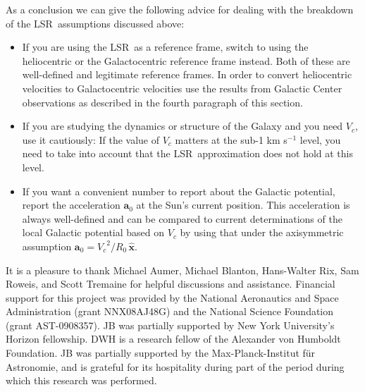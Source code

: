 \documentclass[12pt,preprint]{aastex}
\renewcommand{\vec}[1]{\mathbf{#1}} %
\newcommand{\eex}{\vec{\hat{x}}}
\newcommand{\lsrabb}{LSR}
\newcommand{\vcirc}{\ensuremath{V_c}}
\newcommand{\aao}{\vec{a}_0}
\begin{document}
As a conclusion we can give the following advice for dealing with the
breakdown of the \lsrabb\ assumptions discussed above:
\begin{itemize}
\item If you are using the \lsrabb\ as a reference frame, switch to
using the heliocentric or the Galactocentric reference frame
instead. Both of these are well-defined and legitimate reference
frames. In order to convert heliocentric velocities to Galactocentric
velocities use the results from Galactic Center observations as
described in the fourth paragraph of this section.
\item If you are studying the dynamics or structure of the Galaxy and
you need $\vcirc$, use it cautiously: If the value of $\vcirc$ matters
at the sub-1 km s$^{-1}$ level, you need to take into account that the
\lsrabb\ approximation does not hold at this level.
\item If you want a convenient number to report about the Galactic
potential, report the acceleration $\aao$ at the Sun's current
position. This acceleration is always well-defined and can be compared
to current determinations of the local Galactic potential based on
$\vcirc$ by using that under the axisymmetric assumption $\aao =
\vcirc^2/R_0 \,\eex$.
\end{itemize}


\acknowledgments It is a pleasure to thank Michael Aumer, Michael
Blanton, Hans-Walter Rix, Sam Roweis, and Scott Tremaine for helpful
discussions and assistance.  Financial support for this project was
provided by the National Aeronautics and Space Administration (grant
NNX08AJ48G) and the National Science Foundation (grant
AST-0908357). JB was partially supported by New York University's
Horizon fellowship. DWH is a research fellow of the Alexander von
Humboldt Foundation. JB was partially supported by the
Max-Planck-Institut f\"ur Astronomie, and is grateful for its
hospitality during part of the period during which this research was
performed.
\end{document}
